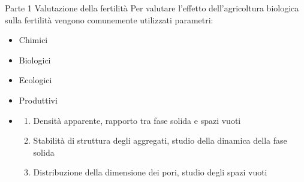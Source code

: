 \documentclass[xcolor={usenames, table, x11names}, final, 10pt]{beamer}
\begin{document}
\begin{frame}{Parte 1 \small{Valutazione della fertilità}}
  Per valutare l'effetto dell'agricoltura biologica sulla fertilità
  vengono comunemente utilizzati parametri:
  \begin{itemize}[<+->]
    \pause
  \item Chimici
  \item Biologici
  \item Ecologici
  \item Produttivi
  \item {}

    \begin{enumerate}[<+->]
      \pause
    \item  \large{Densità apparente}, \normalsize{rapporto tra fase
        solida e spazi vuoti}
      \vfill
    \item \large{Stabilità di struttura degli aggregati},
      \normalsize{studio della dinamica della fase solida} 
      \vfill
    \item  \large{Distribuzione della dimensione dei pori}, \normalsize{studio degli spazi vuoti}
    \end{enumerate}
  \end{itemize}
  
\end{frame}
\end{document}
